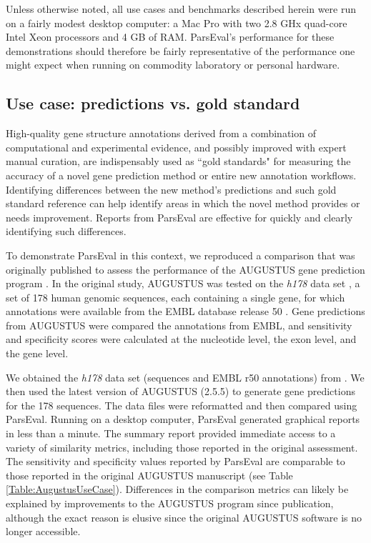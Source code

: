 Unless otherwise noted, all use cases and benchmarks described herein were run on a fairly modest desktop computer: a Mac Pro with two 2.8 GHx quad-core Intel Xeon processors and 4 GB of RAM.
ParsEval's performance for these demonstrations should therefore be fairly representative of the performance one might expect when running on commodity laboratory or personal hardware.


\subsection{Use case: predictions vs. gold standard}
High-quality gene structure annotations derived from a combination of computational and experimental evidence, and possibly improved with expert manual curation, are indispensably used as ``gold standards" for measuring the accuracy of a novel gene prediction method or entire new annotation workflows.
Identifying differences between the new method's predictions and such gold standard reference can help identify areas in which the novel method provides or needs improvement.
Reports from ParsEval are effective for quickly and clearly identifying such differences.

To demonstrate ParsEval in this context, we reproduced a comparison that was originally published to assess the performance of the AUGUSTUS gene prediction program  \citep{Stanke2003}.
In the original study, AUGUSTUS was tested on the \emph{h178} data set \citep{Guigo2000}, a set of 178 human genomic sequences, each containing a single gene, for which annotations were available from the EMBL database release 50 \citep{embl}.
Gene predictions from AUGUSTUS were compared the annotations from EMBL, and sensitivity and specificity scores were calculated at the nucleotide level, the exon level, and the gene level.

We obtained the \emph{h178} data set (sequences and EMBL r50 annotations) from  \citep{imim}.
We then used the latest version of AUGUSTUS (2.5.5) to generate gene predictions for the 178 sequences.
The data files were reformatted and then compared using ParsEval.
Running on a desktop computer, ParsEval generated graphical reports in less than a minute.
The summary report provided immediate access to a variety of similarity metrics, including those reported in the original assessment.
The sensitivity and specificity values reported by ParsEval are comparable to those reported in the original AUGUSTUS manuscript (see Table \ref{Table:AugustusUseCase}).
Differences in the comparison metrics can likely be explained by improvements to the AUGUSTUS program since publication, although the exact reason is elusive since the original AUGUSTUS software is no longer accessible.

